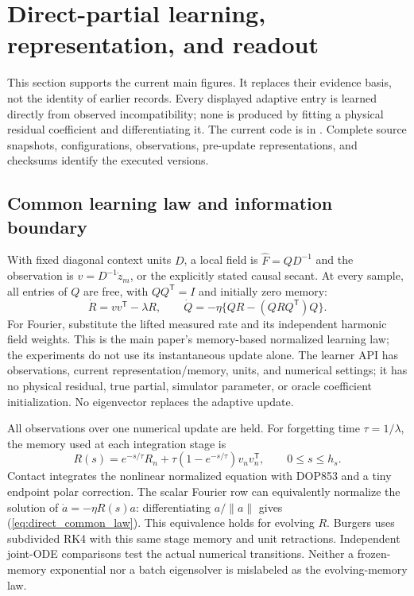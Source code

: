 \section{Direct-partial learning, representation, and readout}
\label{sec:direct_main}
This section supports the current main figures. It replaces their evidence
basis, not the identity of earlier records. Every displayed adaptive entry
is learned directly from observed incompatibility; none is produced by
fitting a physical residual coefficient and differentiating it. The current
code is in . Complete source snapshots,
configurations, observations, pre-update representations, and checksums
identify the executed versions.

\subsection{Common learning law and information boundary}
With fixed diagonal context units $D$, a local field is
$\widehat F=QD^{-1}$ and the observation is $v=D^{-1}\dot z_m$, or the
explicitly stated causal secant. At every sample, all entries of $Q$ are
free, with $QQ^{\mathsf T}=I$ and initially zero memory:
\begin{equation}
 \dot R=vv^{\mathsf T}-\lambda R,\qquad
 \dot Q=-\eta\{QR-(QRQ^{\mathsf T})Q\}.
 \label{eq:direct_common_law}
\end{equation}
For Fourier, substitute the lifted measured rate and its independent harmonic
field weights. This is the main paper's memory-based normalized learning law;
the experiments do not use its instantaneous update alone. The learner API
has observations, current representation/memory, units, and numerical settings;
it has no physical residual, true partial, simulator parameter, or oracle
coefficient initialization. No eigenvector replaces the adaptive update.

All observations over one numerical update are held. For forgetting time
$\tau=1/\lambda$, the memory used at each integration stage is
\begin{equation}
 R(s)=e^{-s/\tau}R_n+\tau(1-e^{-s/\tau})v_nv_n^{\mathsf T},
 \qquad 0\le s\le h_s.
 \label{eq:direct_stage_memory}
\end{equation}
Contact integrates the nonlinear normalized equation with DOP853 and a tiny
endpoint polar correction. The scalar Fourier row can equivalently normalize
the solution of $\dot a=-\eta R(s)a$: differentiating $a/\|a\|$ gives
(\ref{eq:direct_common_law}). This equivalence holds for evolving $R$.
Burgers uses subdivided RK4 with this same stage memory and unit retractions.
Independent joint-ODE comparisons test the actual numerical transitions.
Neither a frozen-memory exponential nor a batch eigensolver is mislabeled
as the evolving-memory law.


